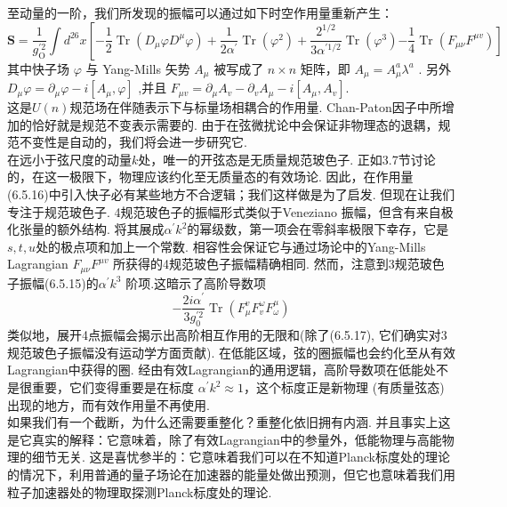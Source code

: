 至动量的一阶，我们所发现的振幅可以通过如下时空作用量重新产生：
\begin{equation}
		\boldsymbol{S}=\frac{1}{g_{\mathrm{O}}^{\prime 2}} \int d^{26} x\left[-\frac{1}{2} \operatorname{Tr}\left(D_{\mu} \varphi D^{\mu} \varphi\right)+\frac{1}{2 \alpha^{\prime}} \operatorname{Tr}\left(\varphi^{2}\right)+\frac{2^{1 / 2}}{3 \alpha^{\prime 1 / 2}} \operatorname{Tr}\left(\varphi^{3}\right)\right.
		\left.-\frac{1}{4} \operatorname{Tr}\left(F_{\mu \nu} F^{\mu v}\right)\right]
\end{equation}
其中快子场 $\varphi$ 与 Yang-Mills 矢势 $A_{\mu}$ 被写成了 $n \times n$ 矩阵，即 $A_{\mu}=A_{\mu}^{a} \lambda^{a} $ . 
另外 $D_{\mu} \varphi=\partial_{\mu} \varphi-i\left[A_{\mu}, \varphi\right]$ ,并且 $F_{\mu v}=\partial_{\mu} A_{v}-\partial_{v} A_{\mu}-i\left[A_{\mu}, A_{v}\right]$.\\
这是$U(n)$规范场在伴随表示下与标量场相耦合的作用量. Chan-Paton因子中所增加的恰好就是规范不变表示需要的. 由于在弦微扰论中会保证非物理态的退耦，规范不变性是自动的，我们将会进一步研究它.\\
在远小于弦尺度的动量$k$处，唯一的开弦态是无质量规范玻色子. 正如3.7节讨论的，在这一极限下，物理应该约化至无质量态的有效场论. 因此，在作用量 (6.5.16)中引入快子必有某些地方不合逻辑；我们这样做是为了启发. 但现在让我们专注于规范玻色子. 4规范玻色子的振幅形式类似于Veneziano 振幅，但含有来自极化张量的额外结构. 将其展成$\alpha^{\prime} k^{2}$的幂级数，第一项会在零斜率极限下幸存，它是$s, t, u$处的极点项和加上一个常数. 相容性会保证它与通过场论中的Yang-Mills Lagrangian $F_{\mu \nu} F^{\mu v} $ 所获得的4规范玻色子振幅精确相同. 然而，注意到3规范玻色子振幅(6.5.15)的$\alpha^{\prime} k^{3}$ 阶项.这暗示了高阶导数项
\begin{equation}
	-\frac{2 i \alpha^{\prime}}{3 g_{0}^{\prime 2}} \operatorname{Tr}\left(F_{\mu}^{v} F_{v}^{\omega} F_{\omega}^{\mu}\right)
\end{equation}
类似地，展开4点振幅会揭示出高阶相互作用的无限和(除了(6.5.17), 它们确实对3规范玻色子振幅没有运动学方面贡献). 在低能区域，弦的圈振幅也会约化至从有效Lagrangian中获得的圈.  经由有效Lagrangian的通用逻辑，高阶导数项在低能处不是很重要，它们变得重要是在标度 $\alpha^{\prime} k^{2} \approx 1$，这个标度正是新物理 (有质量弦态) 出现的地方，而有效作用量不再使用.\\
如果我们有一个截断，为什么还需要重整化？重整化依旧拥有内涵. 并且事实上这是它真实的解释：它意味着，除了有效Lagrangian中的参量外，低能物理与高能物理的细节无关. 这是喜忧参半的：它意味着我们可以在不知道Planck标度处的理论的情况下，利用普通的量子场论在加速器的能量处做出预测，但它也意味着我们用粒子加速器处的物理取探测Planck标度处的理论.\\
